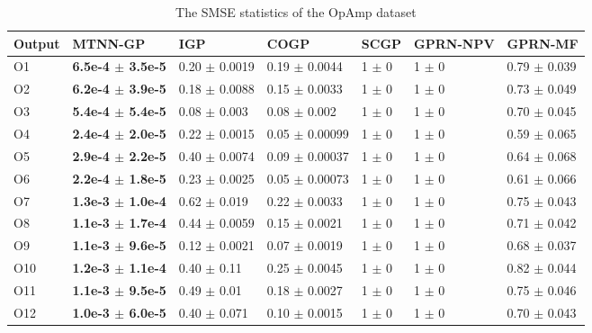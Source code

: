 \begin{table}[!htb]
    \centering
    \caption{The SMSE statistics of the OpAmp dataset}
    \label{tab:smse_DAC}
    \begin{tabular}{lllllll}
        \toprule
        Output & MTNN-GP               &  IGP                  & COGP                  & SCGP          &  GPRN-NPV    & GPRN-MF            \\ \midrule
        O1     &  \textbf{6.5e-4 $\pm$  3.5e-5} &  0.20 $\pm$  0.0019   &  0.19 $\pm$  0.0044   &  1  $\pm$  0  &  1  $\pm$  0 &  0.79 $\pm$  0.039 \\
        O2     &  \textbf{6.2e-4 $\pm$  3.9e-5} &  0.18 $\pm$  0.0088   &  0.15 $\pm$  0.0033   &  1  $\pm$  0  &  1  $\pm$  0 &  0.73 $\pm$  0.049 \\
        O3     &  \textbf{5.4e-4 $\pm$  5.4e-5} &  0.08 $\pm$  0.003    &  0.08 $\pm$  0.002    &  1  $\pm$  0  &  1  $\pm$  0 &  0.70 $\pm$  0.045 \\
        O4     &  \textbf{2.4e-4 $\pm$  2.0e-5} &  0.22 $\pm$  0.0015   &  0.05 $\pm$  0.00099  &  1  $\pm$  0  &  1  $\pm$  0 &  0.59 $\pm$  0.065 \\
        O5     &  \textbf{2.9e-4 $\pm$  2.2e-5} &  0.40 $\pm$  0.0074   &  0.09 $\pm$  0.00037  &  1  $\pm$  0  &  1  $\pm$  0 &  0.64 $\pm$  0.068 \\
        O6     &  \textbf{2.2e-4 $\pm$  1.8e-5} &  0.23 $\pm$  0.0025   &  0.05 $\pm$  0.00073  &  1  $\pm$  0  &  1  $\pm$  0 &  0.61 $\pm$  0.066 \\
        O7     &  \textbf{1.3e-3 $\pm$  1.0e-4} &  0.62 $\pm$  0.019    &  0.22 $\pm$  0.0033   &  1  $\pm$  0  &  1  $\pm$  0 &  0.75 $\pm$  0.043 \\
        O8     &  \textbf{1.1e-3 $\pm$  1.7e-4} &  0.44 $\pm$  0.0059   &  0.15 $\pm$  0.0021   &  1  $\pm$  0  &  1  $\pm$  0 &  0.71 $\pm$  0.042 \\
        O9     &  \textbf{1.1e-3 $\pm$  9.6e-5} &  0.12 $\pm$  0.0021   &  0.07 $\pm$  0.0019   &  1  $\pm$  0  &  1  $\pm$  0 &  0.68 $\pm$  0.037 \\
        O10    &  \textbf{1.2e-3 $\pm$  1.1e-4} &  0.40 $\pm$  0.11     &  0.25 $\pm$  0.0045   &  1  $\pm$  0  &  1  $\pm$  0 &  0.82 $\pm$  0.044 \\
        O11    &  \textbf{1.1e-3 $\pm$  9.5e-5} &  0.49 $\pm$  0.01     &  0.18 $\pm$  0.0027   &  1  $\pm$  0  &  1  $\pm$  0 &  0.75 $\pm$  0.046 \\
        O12    &  \textbf{1.0e-3 $\pm$  6.0e-5} &  0.40 $\pm$  0.071    &  0.10 $\pm$  0.0015   &  1  $\pm$  0  &  1  $\pm$  0 &  0.70 $\pm$  0.043 \\

\end{tabular}
\end{table}
